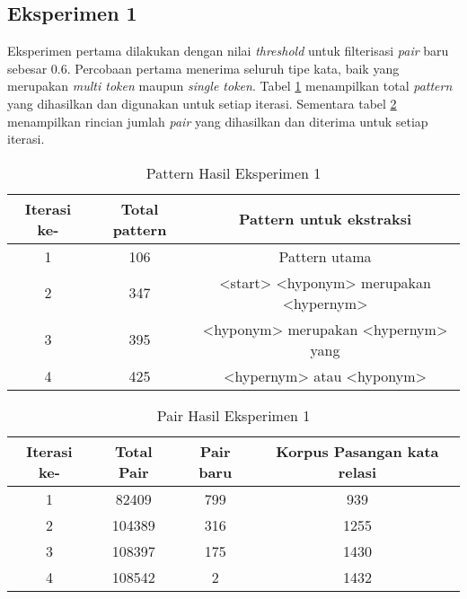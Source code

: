 \subsection{Eksperimen 1}
Eksperimen pertama dilakukan dengan nilai \textit{threshold} untuk filterisasi \textit{pair} baru sebesar 0.6. Percobaan pertama menerima seluruh tipe kata, baik yang merupakan \textit{multi token} maupun \textit{single token}. Tabel \ref{table:eksp1-pattern} menampilkan total \textit{pattern} yang dihasilkan dan digunakan untuk setiap iterasi. Sementara tabel \ref{table:eksp1-pair} menampilkan rincian jumlah \textit{pair} yang dihasilkan dan diterima untuk setiap iterasi.

\begin{table}
  \centering
  \caption{Pattern Hasil Eksperimen 1}
  \label{table:eksp1-pattern}
  \begin{tabular}{|c|c|c|}
  \hline
  Iterasi ke- & Total pattern & Pattern untuk ekstraksi                 \\ \hline
  1           & 106           & Pattern utama                           \\ \hline
  2           & 347           & <start> <hyponym> merupakan <hypernym>  \\ \hline
  3           & 395           & <hyponym> merupakan <hypernym> yang     \\ \hline
  4           & 425           & <hypernym> atau <hyponym>               \\ \hline
  \end{tabular} 
\end{table}

\begin{table}
  \centering
  \caption{Pair Hasil Eksperimen 1}
  \label{table:eksp1-pair}
  \begin{tabular}{|c|c|c|c|}
  \hline
  Iterasi ke-  & Total Pair & Pair baru & Korpus Pasangan kata relasi \\ \hline
  1            & 82409      & 799       & 939  \\ \hline
  2            & 104389     & 316       & 1255 \\ \hline
  3            & 108397     & 175       & 1430 \\ \hline
  4            & 108542     & 2         & 1432 \\ \hline
  \end{tabular} 
\end{table}

